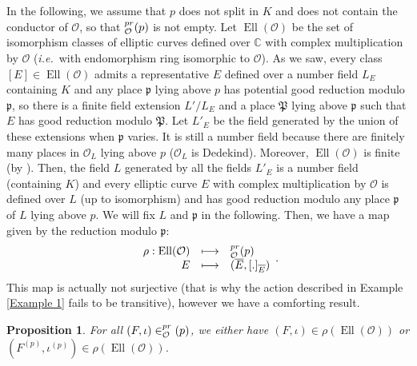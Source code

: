 \documentclass[a4paper,10pt]{report}
\theoremstyle{definition}
\theoremstyle{plain}
\newtheorem{Proposition}[Definition]{Proposition}
\theoremstyle{definition}
\newcommand{\ie}{\emph{i.e.}\ }
\newcommand{\C}{\mathbb{C}}
\newcommand{\mO}{\mathcal{O}}
\renewcommand{\(}{\left(}
\renewcommand{\)}{\right)}
\newcommand{\mf}[1]{\mathfrak{#1}}
\newcommand{\mfp}{\mathfrak{p}}
\let\SS\relax
\DeclareMathOperator{\SS}{SS}
\DeclareMathOperator{\Ell}{Ell}
\begin{document}
In the following, we assume that $p$ does not split in $K$ and does not contain the conductor of $\mO$, so that $\SS_\mO^{pr}(p)$ is not empty.  Let $\Ell(\mO)$ be the set of isomorphism classes of elliptic curves defined over $\C$ with complex multiplication by $\mO$ (\ie  with endomorphism ring isomorphic to $ \mO$). As we saw, every class $[E]\in\Ell(\mO)$ admits a representative $E$ defined over a number field $L_E$ containing $K$ and any place $\mfp$ lying above $p$ has potential good reduction modulo $\mfp$, so there is a finite field extension $L'/L_E$ and a place $\mf{P}$ lying above $\mfp$ such that $E$ has good reduction modulo $\mf{P}$. Let $L'_E$ be the field generated by the union of these extensions when $\mfp$ varies.  It is still a number field because there are finitely many places in $\mO_L$ lying above $p$ ($\mO_L$ is Dedekind).  Moreover,  $\Ell(\mO)$ is finite (by \cite[Proposition II.2.1.(b)]{Silverman2}). Then, the field $L$ generated by all the fields $L'_E$ is a number field (containing $K$) and every elliptic curve $E$ with complex multiplication by $\mO$ is defined over $L$ (up to isomorphism) and has good reduction modulo any place $\mfp$ of $L$ lying above $p$.  We will fix $L$ and $\mfp$ in the following.  Then, we have a map given by the reduction modulo $\mfp$:
\[\begin{array}{rcl} \rho : \Ell(\mO)& \longmapsto& \SS_\mO^{pr}(p)\\ 
E&\longmapsto&(\overline{E},[.]_{\overline{E}})
\end{array}.\]
This map is actually not surjective (that is why the action described in Example \ref{Example 1} fails to be transitive), however we have a comforting result.

\begin{Proposition}\label{Proposition 6}
For all $(F,\iota)\in\SS_\mO^{pr}(p)$, we either have $(F,\iota)\in\rho(\Ell(\mO))$ or $(F^{(p)},\iota^{(p)})\in\rho(\Ell(\mO))$.
\end{Proposition}
\end{document}
